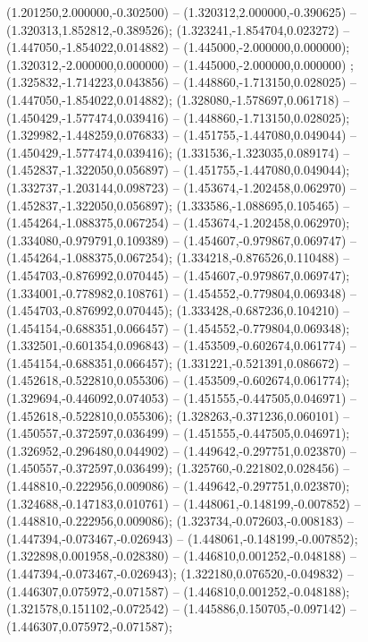  (1.201250,2.000000,-0.302500) -- (1.320312,2.000000,-0.390625) -- (1.320313,1.852812,-0.389526);
 (1.323241,-1.854704,0.023272) -- (1.447050,-1.854022,0.014882) -- (1.445000,-2.000000,0.000000);
 (1.320312,-2.000000,0.000000) -- (1.445000,-2.000000,0.000000) ;
 (1.325832,-1.714223,0.043856) -- (1.448860,-1.713150,0.028025) -- (1.447050,-1.854022,0.014882);
 (1.328080,-1.578697,0.061718) -- (1.450429,-1.577474,0.039416) -- (1.448860,-1.713150,0.028025);
 (1.329982,-1.448259,0.076833) -- (1.451755,-1.447080,0.049044) -- (1.450429,-1.577474,0.039416);
 (1.331536,-1.323035,0.089174) -- (1.452837,-1.322050,0.056897) -- (1.451755,-1.447080,0.049044);
 (1.332737,-1.203144,0.098723) -- (1.453674,-1.202458,0.062970) -- (1.452837,-1.322050,0.056897);
 (1.333586,-1.088695,0.105465) -- (1.454264,-1.088375,0.067254) -- (1.453674,-1.202458,0.062970);
 (1.334080,-0.979791,0.109389) -- (1.454607,-0.979867,0.069747) -- (1.454264,-1.088375,0.067254);
 (1.334218,-0.876526,0.110488) -- (1.454703,-0.876992,0.070445) -- (1.454607,-0.979867,0.069747);
 (1.334001,-0.778982,0.108761) -- (1.454552,-0.779804,0.069348) -- (1.454703,-0.876992,0.070445);
 (1.333428,-0.687236,0.104210) -- (1.454154,-0.688351,0.066457) -- (1.454552,-0.779804,0.069348);
 (1.332501,-0.601354,0.096843) -- (1.453509,-0.602674,0.061774) -- (1.454154,-0.688351,0.066457);
 (1.331221,-0.521391,0.086672) -- (1.452618,-0.522810,0.055306) -- (1.453509,-0.602674,0.061774);
 (1.329694,-0.446092,0.074053) -- (1.451555,-0.447505,0.046971) -- (1.452618,-0.522810,0.055306);
 (1.328263,-0.371236,0.060101) -- (1.450557,-0.372597,0.036499) -- (1.451555,-0.447505,0.046971);
 (1.326952,-0.296480,0.044902) -- (1.449642,-0.297751,0.023870) -- (1.450557,-0.372597,0.036499);
 (1.325760,-0.221802,0.028456) -- (1.448810,-0.222956,0.009086) -- (1.449642,-0.297751,0.023870);
 (1.324688,-0.147183,0.010761) -- (1.448061,-0.148199,-0.007852) -- (1.448810,-0.222956,0.009086);
 (1.323734,-0.072603,-0.008183) -- (1.447394,-0.073467,-0.026943) -- (1.448061,-0.148199,-0.007852);
 (1.322898,0.001958,-0.028380) -- (1.446810,0.001252,-0.048188) -- (1.447394,-0.073467,-0.026943);
 (1.322180,0.076520,-0.049832) -- (1.446307,0.075972,-0.071587) -- (1.446810,0.001252,-0.048188);
 (1.321578,0.151102,-0.072542) -- (1.445886,0.150705,-0.097142) -- (1.446307,0.075972,-0.071587);
